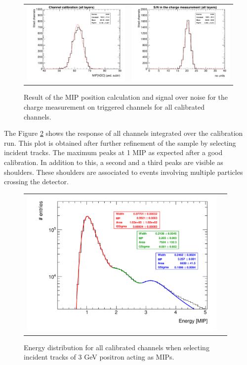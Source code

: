 \documentclass[a4paper,11pt]{article}
\begin{document}
\begin{figure}[!t]
  \centering
  \begin{tabular}{ll}
      \includegraphics[width=2.8in]{MIPsummary_title-eps-converted-to.pdf} & \includegraphics[width=2.8in]{SNsummary_title-eps-converted-to.pdf}  
  \end{tabular}
\caption{Result of the MIP position calculation and signal over noise for the charge measurement on triggered channels for all calibrated channels.}
\label{mipandSN}
\end{figure}

The Figure \ref{mip3peaks} shows the response of all channels integrated over the calibration run.
This plot is obtained after further refinement of the sample by selecting incident tracks.
The maximum peaks at 1 MIP as expected after a good calibration.
In addition to this, a second and a third peaks
are visible as shoulders. These shoulders are associated to 
events involving multiple 
particles crossing the detector.

\begin{figure}[!t]
  \centering 
    \begin{tabular}{ll}
      \includegraphics[width=4in]{MIP3peaks-eps-converted-to.pdf} 
    \end{tabular}
    \caption{Energy distribution for all calibrated channels when selecting incident tracks of 3 GeV positron acting as MIPs.}
\label{mip3peaks}
\end{figure}
\end{document}
